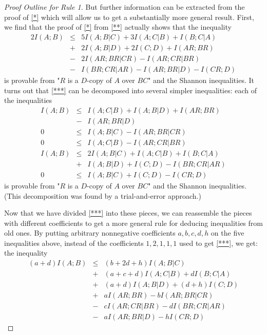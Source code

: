 \documentclass[10pt,journal]{IEEEtran}
\begin{document}
\begin{proof}[Proof Outline for Rule 1]
But further information can be extracted from the proof of \eqref{*}
which will allow us to get a substantially more general result.
First, we find that the proof of \eqref{*} from \eqref{**} actually shows
that the inequality
\begin{eqnarray}\label{***}
    2I(A;B) &\leq& 5I(A;B|C)+3I(A;C|B)+I(B;C|A)\\
\nonumber     &+& 2I(A;B|D)+2I(C;D)+I(AR;BR)\\
\nonumber     &-&2I(AR;BR|CR)-I(AR;CR|BR)\\
\nonumber     &-&I(BR;CR|AR)-I(AR;BR|D)-I(CR;D)
 \end{eqnarray}
is provable from "$R$ is a $D$-copy of $A$ over $BC$" and the
Shannon inequalities.  It turns out that \eqref{***} can be decomposed
into several simpler inequalities: each of the inequalities
\begin{eqnarray*}
       I(A;B) &\leq& I(A;C|B)+I(A;B|D)
                  +I(AR;BR)\\
                  &-&I(AR;BR|D)\\
            0 &\leq& I(A;B|C)
                  -I(AR;BR|CR)\\
            0 &\leq& I(A;C|B)
                  -I(AR;CR|BR)\\
       I(A;B) &\leq& 2I(A;B|C)+I(A;C|B)+I(B;C|A)\\
       &+&I(A;B|D)+I(C;D)
                  -I(BR;CR|AR)\\
            0 &\leq& I(A;B|C)+I(C;D)
                  -I(CR;D)
\end{eqnarray*}
is provable from "$R$ is a $D$-copy of $A$ over $BC$" and the
Shannon inequalities.  (This decomposition was found by a
trial-and-error approach.)

Now that we have divided \eqref{***} into these pieces, we
can reassemble the pieces with different coefficients
to get a more general rule for deducing inequalities from
old ones.  By putting arbitrary nonnegative coefficients $a,b,c,d,h$ on the
five inequalities above, instead of the coefficients $1,2,1,1,1$
used to get \eqref{***}, we get: the inequality
\begin{eqnarray*}\label{****}
     (a+d)I(A;B) &\leq& (b+2d+h)I(A;B|C)\\
\nonumber        &+& (a+c+d)I(A;C|B)+dI(B;C|A)\\
\nonumber        &+&(a+d)I(A;B|D)+(d+h)I(C;D)\\
\nonumber        &+&aI(AR;BR)-bI(AR;BR|CR)\\
\nonumber        &-&cI(AR;CR|BR)-dI(BR;CR|AR)\\
\nonumber        &-&aI(AR;BR|D)-hI(CR;D)
\end{eqnarray*}


\end{proof}
\end{document}
